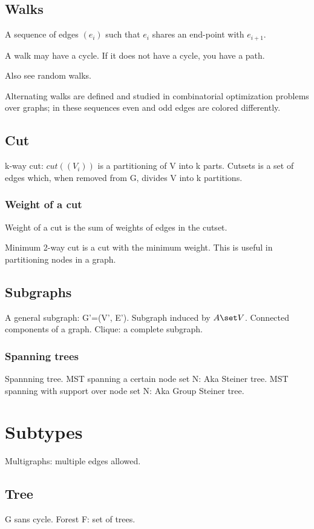 \documentclass[oneside, article]{memoir}
\begin{document}
\subsection{Walks}
A sequence of edges $(e_i)$ such that $e_i$ shares an end-point with $e_{i+1}$.

A walk may have a cycle. If it does not have a cycle, you have a path.

Also see random walks.

Alternating walks are defined and studied in combinatorial optimization problems over graphs; in these sequences even and odd edges are colored differently.


\subsection{Cut}
k-way cut: $cut((V_{i}))$ is a partitioning of V into k parts. Cutsets is a set of edges which, when removed from G, divides V into k partitions.

\subsubsection{Weight of a cut}
Weight of a cut is the sum of weights of edges in the cutset.

Minimum 2-way cut is a cut with the minimum weight. This is useful in partitioning nodes in a graph.

\subsection{Subgraphs}
A general subgraph: G'=(V', E'). Subgraph induced by $A \set V$. Connected components of a graph. Clique: a complete subgraph.

\subsubsection{Spanning trees}
Spannning tree. MST spanning a certain node set N: Aka Steiner tree.
MST spanning with support over node set N: Aka Group Steiner tree.

\section{Subtypes}
Multigraphs: multiple edges allowed.

\subsection{Tree}
G sans cycle. Forest F: set of trees.
\end{document}
